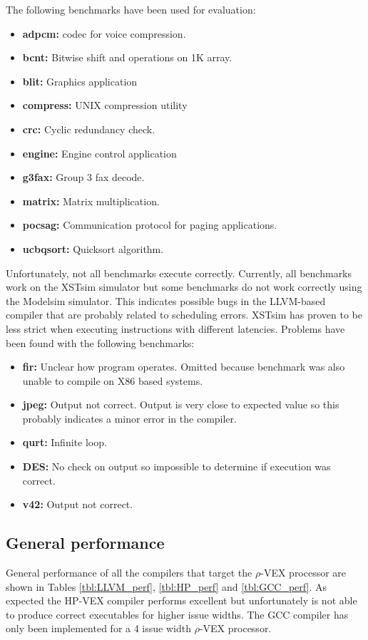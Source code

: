 The following benchmarks have been used for evaluation:

\begin{itemize}
	\item \textbf{adpcm:} codec for voice compression.
	\item \textbf{bcnt:} Bitwise shift and operations on 1K array.
	\item \textbf{blit:} Graphics application
	\item \textbf{compress:} UNIX compression utility
	\item \textbf{crc:} Cyclic redundancy check.
	\item \textbf{engine:} Engine control application
	\item \textbf{g3fax:} Group 3 fax decode.
	\item \textbf{matrix:} Matrix multiplication.
	\item \textbf{pocsag:} Communication protocol for paging applications.
	\item \textbf{ucbqsort:} Quicksort algorithm.
\end{itemize}

Unfortunately, not all benchmarks execute correctly. Currently, all benchmarks work on the XSTsim simulator but some benchmarks do not work correctly using the Modelsim simulator. This indicates possible bugs in the LLVM-based compiler that are probably related to scheduling errors. XSTsim has proven to be less strict when executing instructions with different latencies. Problems have been found with the following benchmarks:

\begin{itemize}
	\item \textbf{fir:} Unclear how program operates. Omitted because benchmark was also unable to compile on X86 based systems.
	\item \textbf{jpeg:} Output not correct. Output is very close to expected value so this probably indicates a minor error in the compiler.
	\item \textbf{qurt:} Infinite loop.
	\item \textbf{DES:} No check on output so impossible to determine if execution was correct.
	\item \textbf{v42:} Output not correct.
\end{itemize}

\subsection{General performance}
General performance of all the compilers that target the $\rho$-VEX processor are shown in Tables \ref{tbl:LLVM_perf}, \ref{tbl:HP_perf} and \ref{tbl:GCC_perf}. As expected the HP-VEX compiler performs excellent but unfortunately is not able to produce correct executables for higher issue widths. The GCC compiler has only been implemented for a 4 issue width $\rho$-VEX processor.

